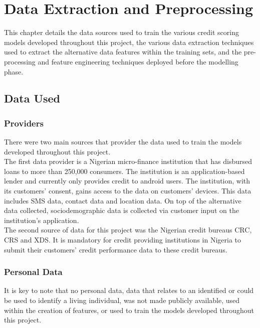 \chapter{Data Extraction and Preprocessing} 
\label{Chapter3}

This chapter details the data sources used to train the various credit scoring models developed throughout this project, the various data extraction techniques used to extract the alternative data features within the training sets, and the pre-processing and feature engineering techniques deployed before the modelling phase.   

\section{Data Used}

\subsection{Providers}

There were two main sources that provider the data used to train the models developed throughout this project. \\

The first data provider is a Nigerian micro-finance institution that has disbursed loans to more than 250,000 consumers. The institution is an application-based lender and currently only provides credit to android users. The institution, with its customers' consent, gains access to the data on customers' devices. This data includes SMS data, contact data and location data. On top of the alternative data collected, sociodemographic data is collected via customer input on the institution's application. \\

The second source of data for this project was the Nigerian credit bureaus CRC, CRS and XDS. It is mandatory for credit providing institutions in Nigeria to submit their customers' credit performance data to these credit bureaus.

\subsection{Personal Data}

It is key to note that no personal data, data that relates to an identified or could be used to identify a living individual, was not made publicly available, used within the creation of features, or used to train the models developed throughout this project. 

